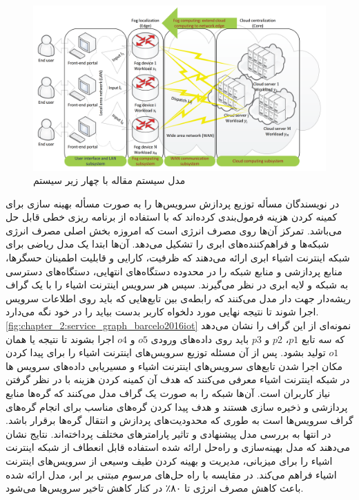     \begin{figure}[h]
      \centerline{\includegraphics[width=11.3cm]{graphics/chapter_2/system_model_deng2016optimal}}
      \caption{مدل سیستم مقاله \cite{deng2016optimal} با چهار زیر سیستم}
      \label{fig:chapter_2:system_model_deng2016optimal}
    \end{figure}

    در \cite{barcelo2016iot} نویسندگان مسأله توزیع پردازش سرویس‌ها‌ را به صورت مسأله بهینه سازی برای کمینه کردن هزینه فرمول‌بندی کرده‌اند که با استفاده از برنامه ریزی خطی قابل حل می‌باشد.
    تمرکز آن‌ها روی مصرف انرژی است که امروزه بخش اصلی مصرف انرژی شبکه‌ها و فراهم‌کننده‌های ابری را تشکیل می‌دهد.
    آن‌ها ابتدا یک مدل ریاضی برای شبکه اینترنت اشیاء ابری ارائه می‌دهند که ظرفیت، کارایی و قابلیت اطمینان حسگر‌ها، منابع پردازشی و منابع شبکه را در محدوده دستگاه‌های انتهایی، دستگاه‌های دسترسی به شبکه و لایه ابری در نظر می‌گیرند.
    سپس هر سرویس اینترنت اشیاء را با یک گراف ریشه‌دار جهت دار مدل می‌کنند که رابطه‌ی بین تابع‌هایی که باید روی اطلاعات سرویس اجرا شوند تا نتیجه نهایی مورد دلخواه کاربر بدست بیاید را در خود نگه می‌دارد.
    \cref{fig:chapter_2:service_graph_barcelo2016iot} نمونه‌ای از این گراف را نشان می‌دهد که سه تابع $p1$، $p2$ و $p3$ باید روی داده‌های ورودی $o5$ و $o4$ اجرا بشوند تا نتیجه یا همان $o1$ تولید بشود.
    پس از آن مسئله توزیع سرویس‌های اینترنت اشیاء را برای پیدا کردن مکان اجرا شدن تابع‌های سرویس‌های اینترنت اشیاء و مسیریابی داده‌های سرویس ها در شبکه اینترنت اشیاء معرفی می‌کنند که هدف آن کمینه کردن هزینه با در نظر گرفتن نیاز کاربران است.
    آن‌ها شبکه را به صورت یک گراف مدل می‌کنند که گره‌ها منابع پردازشی و ذخیره سازی هستند و هدف پیدا کردن گره‌های مناسب برای انجام گره‌های گراف‌ سرویس‌ها است به طوری که محدودیت‌های پردازش و انتقال گره‌ها برقرار باشد.
    در انتها به بررسی مدل پیشنهادی و تاثیر پارامتر‌های مختلف پرداخته‌اند. 
    نتایج نشان می‌دهند که مدل بهینه‌سازی و راه‌حل ارائه شده استفاده قابل انعطاف از شبکه اینترنت اشیاء را برای میزبانی، مدیریت و بهینه کردن طیف وسیعی از سرویس‌های اینترنت اشیاء فراهم می‌کند.
    در مقایسه با راه حل‌های مرسوم مبتنی بر ابر، مدل ارائه شده باعث کاهش مصرف انرژی تا ۸۰٪ در کنار کاهش تاخیر سرویس‌ها می‌شود.


